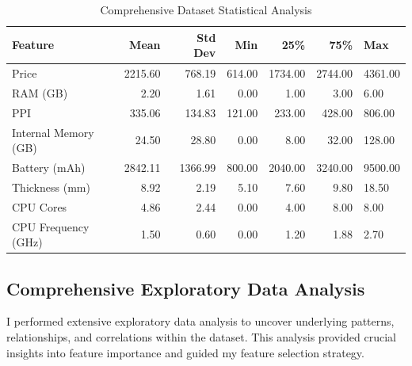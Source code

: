 \documentclass[12pt,a4paper]{article}
\begin{document}
\begin{table}[H]
\centering
\caption{Comprehensive Dataset Statistical Analysis}
\begin{tabular}{lrrrrr}
\toprule
\textbf{Feature} & \textbf{Mean} & \textbf{Std Dev} & \textbf{Min} & \textbf{25\%} & \textbf{75\%} & \textbf{Max} \\
\midrule
Price & 2215.60 & 768.19 & 614.00 & 1734.00 & 2744.00 & 4361.00 \\
RAM (GB) & 2.20 & 1.61 & 0.00 & 1.00 & 3.00 & 6.00 \\
PPI & 335.06 & 134.83 & 121.00 & 233.00 & 428.00 & 806.00 \\
Internal Memory (GB) & 24.50 & 28.80 & 0.00 & 8.00 & 32.00 & 128.00 \\
Battery (mAh) & 2842.11 & 1366.99 & 800.00 & 2040.00 & 3240.00 & 9500.00 \\
Thickness (mm) & 8.92 & 2.19 & 5.10 & 7.60 & 9.80 & 18.50 \\
CPU Cores & 4.86 & 2.44 & 0.00 & 4.00 & 8.00 & 8.00 \\
CPU Frequency (GHz) & 1.50 & 0.60 & 0.00 & 1.20 & 1.88 & 2.70 \\
\bottomrule
\end{tabular}
\end{table}

\subsection{Comprehensive Exploratory Data Analysis}
I performed extensive exploratory data analysis to uncover underlying patterns, relationships, and correlations within the dataset. This analysis provided crucial insights into feature importance and guided my feature selection strategy.
\end{document}
